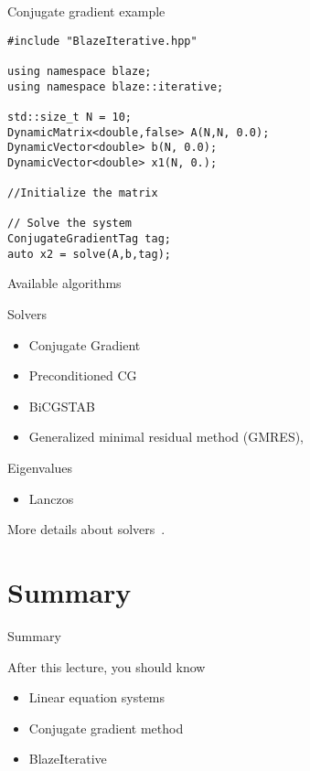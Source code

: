 \documentclass[12pt,t]{beamer}
\begin{document}
\begin{frame}[fragile]{Conjugate gradient example}
\begin{lstlisting}
#include "BlazeIterative.hpp"

using namespace blaze;
using namespace blaze::iterative;

std::size_t N = 10;
DynamicMatrix<double,false> A(N,N, 0.0);
DynamicVector<double> b(N, 0.0);
DynamicVector<double> x1(N, 0.);

//Initialize the matrix

// Solve the system
ConjugateGradientTag tag;
auto x2 = solve(A,b,tag);

\end{lstlisting}

\end{frame}

\begin{frame}{Available algorithms}

\begin{block}{Solvers}
\begin{itemize}
\item Conjugate Gradient
\item Preconditioned CG
\item BiCGSTAB
\item Generalized minimal residual method (GMRES),
\end{itemize}
\end{block}


\begin{block}{Eigenvalues}
\begin{itemize}
\item Lanczos
\end{itemize}
\end{block}
More details about solvers~\cite{barrett1994templates}.
\end{frame}




\section{Summary}
\begin{frame}{Summary}
\begin{block}{After this lecture, you should know}
\begin{itemize}
\item Linear equation systems
\item Conjugate gradient method
\item BlazeIterative
\end{itemize}
\end{block}
\end{frame}
\end{document}
